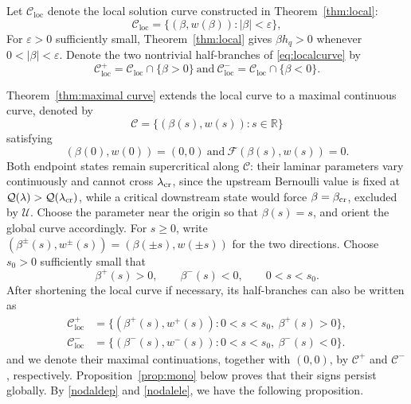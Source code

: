 \documentclass[12pt,letterpaper]{amsart}
\numberwithin{equation}{section}
\def\R{{\mathbb R}}
\begin{document}
{Let $\mathcal C_{\mathrm{loc}}$ denote the local solution curve constructed in Theorem~\ref{thm:local}:}
\begin{equation}\label{eq:localcurve}
	\mathcal{C}_\mathrm{loc}=\{(\beta,w(\beta)):|\beta|<\varepsilon\},
\end{equation}
	{For $\varepsilon>0$ sufficiently small, Theorem~\ref{thm:local} gives $\beta h_q>0$ whenever $0<|\beta|<\varepsilon$. Denote the two nontrivial half-branches of \eqref{eq:localcurve} by}
	\begin{equation*}
		\mathcal{C}_{\mathrm{loc}}^+=\mathcal{C}_{\mathrm{loc}}\cap\{\beta>0\}\mathrm{~and~}\mathcal{C}_{\mathrm{loc}}^-=\mathcal{C}_{\mathrm{loc}}\cap\{\beta<0\}.
	\end{equation*}
	
{Theorem~\ref{thm:maximal curve} extends the local curve to a maximal continuous curve, denoted by}
\begin{equation} \label{zyy}
	\mathcal{C}=\{(\beta(s),w(s)):s\in\R\}
\end{equation}
	satisfying
	\begin{equation*}
		(\beta(0),w(0))=(0,0)\mathrm{~and~}\mathcal{F}(\beta(s),w(s))=0.
	\end{equation*}
Both endpoint states remain supercritical along $\mathcal C$: their laminar parameters vary continuously and cannot cross $\lambda_{\rm cr}$, since the upstream Bernoulli value is fixed at $\mathcal Q(\lambda)>\mathcal Q(\lambda_{\rm cr})$, while a critical downstream state would force $\beta=\beta_{\rm cr}$, excluded by $\mathscr U$.
	{Choose the parameter near the origin so that $\beta(s)=s$, and orient the global curve accordingly. For $s\geq0$, write $(\beta^\pm(s),w^\pm(s))=(\beta(\pm s),w(\pm s))$ for the two directions. Choose $s_0>0$ sufficiently small that}
	\begin{equation*}
		{\beta^+(s)>0,\qquad\beta^-(s)<0,\qquad 0<s<s_0.}
	\end{equation*}
	{After shortening the local curve if necessary, its half-branches can also be written as}
\begin{equation*}
	{\begin{aligned}
\mathcal C_{\mathrm{loc}}^+&=\{(\beta^+(s),w^+(s)):0<s<s_0,\ \beta^+(s)>0\},\\
\mathcal C_{\mathrm{loc}}^-&=\{(\beta^-(s),w^-(s)):0<s<s_0,\ \beta^-(s)<0\}.
\end{aligned}}
\end{equation*}
	and we denote their maximal continuations, together with $(0,0)$, by $\mathcal C^+$ and $\mathcal C^-$, respectively. {Proposition~\ref{prop:mono} below proves that their signs persist globally.} By \eqref{nodaldep} and \eqref{nodalele}, we have the following proposition.
	
\end{document}
